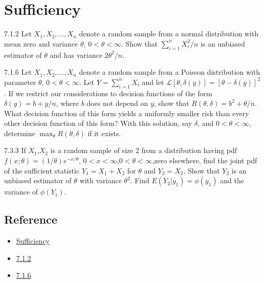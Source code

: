 \chapter{Sufficiency}

\begin{exercise}{7.1.2}{}
    Let $X_1,X_2,\dots,X_n$ denote a random sample from a normal distribution with mean zero and variance $\theta$, $0<\theta<\infty$.
    Show that $\sum\limits_{i=1}^{n} X_i^2/n$ is an unbiased estimator of $\theta$ and has variance $2\theta^2/n$.
\end{exercise}

\begin{exercise}{7.1.6}{}
    Let $X_1,X_2,\dots,X_n$ denote a random sample from a Poisson distribution with parameter $\theta$, 
    $0<\theta<\infty$. Let $Y=\sum\limits_{i=1}^{n}X_i$ and let $\mathcal{L}[\theta,\delta(y)]=[\theta-\delta(y)]^2$. 
    If we restrict our considerations to decision functions of the form $\delta(y)=b+y/n$, where $b$ does not depend on $y$,
    show that $R(\theta,\delta)=b^2+\theta/n$. What decision function of this form yields a uniformly smaller risk than every other 
    decision function of this form?
    With this solution, say $\delta$, and $0<\theta<\infty$, determine $\max_{\theta} R(\theta,\delta)$ if it exists.
\end{exercise}

\begin{exercise}{7.3.3}{}
    If $X_1$,$X_2$ is a random sample of size $2$ from a distribution having pdf $f(x;\theta)=(1/\theta)e^{-x/\theta}$,
    $0<x<\infty$,$0<\theta<\infty$,zero elsewhere, find the joint pdf of the sufficient statistic $Y_1=X_1+X_2$ for $\theta$
    and $Y_2=X_2$. Show that $Y_2$ is an unbiased estimator of $\theta$ with variance $\theta^2$. Find $E(Y_2|y_1)=\phi(y_1)$ and 
    the variance of $\phi(Y_1)$.
\end{exercise}

\section{Reference}

\begin{itemize}
    \item \href{https://www.stat.purdue.edu/~tlzhang/stat517/chapter7_517.pdf}{Sufficiency}
    \item \href{https://tomoki-okuno.com/files/math/Ch7_sol.pdf}{7.1.2}
    \item \href{https://zhuanlan.zhihu.com/p/570096188}{7.1.6}
\end{itemize}
